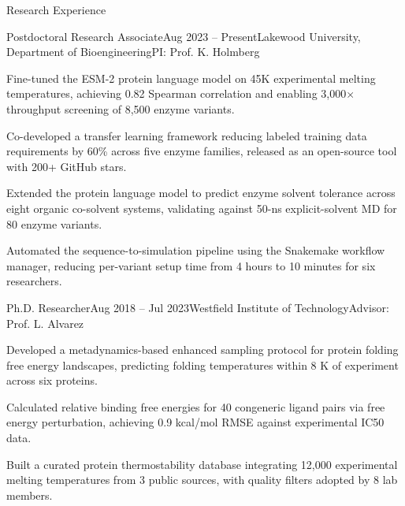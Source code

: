 \documentclass{cv}
\begin{document}
\begin{rSection}{Research Experience}

\begin{rSubsection}{Postdoctoral Research Associate}{\textcolor{black!60}{Aug 2023 -- Present}}{Lakewood University, Department of Bioengineering}{PI: Prof. K. Holmberg}

\item Fine-tuned the ESM-2 protein language model on 45K experimental melting temperatures, achieving 0.82 Spearman correlation and enabling 3,000$\times$ throughput screening of 8,500 enzyme variants.
\item Co-developed a transfer learning framework reducing labeled training data requirements by 60\% across five enzyme families, released as an open-source tool with 200+ GitHub stars.
\item Extended the protein language model to predict enzyme solvent tolerance across eight organic co-solvent systems, validating against 50-ns explicit-solvent MD for 80 enzyme variants.
\item Automated the sequence-to-simulation pipeline using the Snakemake workflow manager, reducing per-variant setup time from 4 hours to 10 minutes for six researchers.

\end{rSubsection}

\begin{rSubsection}{Ph.D. Researcher}{\textcolor{black!60}{Aug 2018 -- Jul 2023}}{Westfield Institute of Technology}{Advisor: Prof. L. Alvarez}

\item Developed a metadynamics-based enhanced sampling protocol for protein folding free energy landscapes, predicting folding temperatures within 8 K of experiment across six proteins.
\item Calculated relative binding free energies for 40 congeneric ligand pairs via free energy perturbation, achieving 0.9 kcal/mol RMSE against experimental IC50 data.
\item Built a curated protein thermostability database integrating 12,000 experimental melting temperatures from 3 public sources, with quality filters adopted by 8 lab members.


\end{rSubsection}
\end{rSection}
\end{document}
